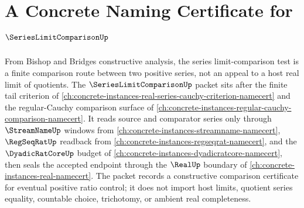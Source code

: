 \chapter{A Concrete Naming Certificate for $\SeriesLimitComparisonUp$}
\label{ch:concrete-instances-series-limit-comparison-namecert}

From Bishop and Bridges constructive analysis, the series limit-comparison test is a finite comparison route between two positive series, not an appeal to a host real limit of quotients. The $\SeriesLimitComparisonUp$ packet sits after the finite tail criterion of \autoref{ch:concrete-instances-real-series-cauchy-criterion-namecert} and the regular-Cauchy comparison surface of \autoref{ch:concrete-instances-regular-cauchy-comparison-namecert}. It reads source and comparator series only through $\StreamNameUp$ windows from \autoref{ch:concrete-instances-streamname-namecert}, $\RegSeqRatUp$ readback from \autoref{ch:concrete-instances-regseqrat-namecert}, and the $\DyadicRatCoreUp$ budget of \autoref{ch:concrete-instances-dyadicratcore-namecert}, then seals the accepted endpoint through the $\RealUp$ boundary of \autoref{ch:concrete-instances-real-namecert}. The packet records a constructive comparison certificate for eventual positive ratio control; it does not import host limits, quotient series equality, countable choice, trichotomy, or ambient real completeness.

